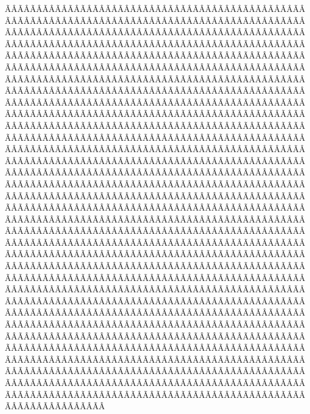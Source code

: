 \begin{sumilla}
\begin{fundamentacion}
ÃÂÃÂÃÂÃÂÃÂÃÂÃÂÃÂÃÂÃÂÃÂÃÂÃÂÃÂÃÂÃÂÃÂÃÂÃÂÃÂÃÂÃÂÃÂÃÂÃÂÃÂÃÂÃÂÃÂÃÂÃÂÃÂÃÂÃÂÃÂÃÂÃÂÃÂÃÂÃÂÃÂÃÂÃÂÃÂÃÂÃÂÃÂÃÂÃÂÃÂÃÂÃÂÃÂÃÂÃÂÃÂÃÂÃÂÃÂÃÂÃÂÃÂÃÂÃÂÃÂÃÂÃÂÃÂÃÂÃÂÃÂÃÂÃÂÃÂÃÂÃÂÃÂÃÂÃÂÃÂÃÂÃÂÃÂÃÂÃÂÃÂÃÂÃÂÃÂÃÂÃÂÃÂÃÂÃÂÃÂÃÂÃÂÃÂÃÂÃÂÃÂÃÂÃÂÃÂÃÂÃÂÃÂÃÂÃÂÃÂÃÂÃÂÃÂÃÂÃÂÃÂÃÂÃÂÃÂÃÂÃÂÃÂÃÂÃÂÃÂÃÂÃÂÃÂÃÂÃÂÃÂÃÂÃÂÃÂÃÂÃÂÃÂÃÂÃÂÃÂÃÂÃÂÃÂÃÂÃÂÃÂÃÂÃÂÃÂÃÂÃÂÃÂÃÂÃÂÃÂÃÂÃÂÃÂÃÂÃÂÃÂÃÂÃÂÃÂÃÂÃÂÃÂÃÂÃÂÃÂÃÂÃÂÃÂÃÂÃÂÃÂÃÂÃÂÃÂÃÂÃÂÃÂÃÂÃÂÃÂÃÂÃÂÃÂÃÂÃÂÃÂÃÂÃÂÃÂÃÂÃÂÃÂÃÂÃÂÃÂÃÂÃÂÃÂÃÂÃÂÃÂÃÂÃÂÃÂÃÂÃÂÃÂÃÂÃÂÃÂÃÂÃÂÃÂÃÂÃÂÃÂÃÂÃÂÃÂÃÂÃÂÃÂÃÂÃÂÃÂÃÂÃÂÃÂÃÂÃÂÃÂÃÂÃÂÃÂÃÂÃÂÃÂÃÂÃÂÃÂÃÂÃÂÃÂÃÂÃÂÃÂÃÂÃÂÃÂÃÂÃÂÃÂÃÂÃÂÃÂÃÂÃÂÃÂÃÂÃÂÃÂÃÂÃÂÃÂÃÂÃÂÃÂÃÂÃÂÃÂÃÂÃÂÃÂÃÂÃÂÃÂÃÂÃÂÃÂÃÂÃÂÃÂÃÂÃÂÃÂÃÂÃÂÃÂÃÂÃÂÃÂÃÂÃÂÃÂÃÂÃÂÃÂÃÂÃÂÃÂÃÂÃÂÃÂÃÂÃÂÃÂÃÂÃÂÃÂÃÂÃÂÃÂÃÂÃÂÃÂÃÂÃÂÃÂÃÂÃÂÃÂÃÂÃÂÃÂÃÂÃÂÃÂÃÂÃÂÃÂÃÂÃÂÃÂÃÂÃÂÃÂÃÂÃÂÃÂÃÂÃÂÃÂÃÂÃÂÃÂÃÂÃÂÃÂÃÂÃÂÃÂÃÂÃÂÃÂÃÂÃÂÃÂÃÂÃÂÃÂÃÂÃÂÃÂÃÂÃÂÃÂÃÂÃÂÃÂÃÂÃÂÃÂÃÂÃÂÃÂÃÂÃÂÃÂÃÂÃÂÃÂÃÂÃÂÃÂÃÂÃÂÃÂÃÂÃÂÃÂÃÂÃÂÃÂÃÂÃÂÃÂÃÂÃÂÃÂÃÂÃÂÃÂÃÂÃÂÃÂÃÂÃÂÃÂÃÂÃÂÃÂÃÂÃÂÃÂÃÂÃÂÃÂÃÂÃÂÃÂÃÂÃÂÃÂÃÂÃÂÃÂÃÂÃÂÃÂÃÂÃÂÃÂÃÂÃÂÃÂÃÂÃÂÃÂÃÂÃÂÃÂÃÂÃÂÃÂÃÂÃÂÃÂÃÂÃÂÃÂÃÂÃÂÃÂÃÂÃÂÃÂÃÂÃÂÃÂÃÂÃÂÃÂÃÂÃÂÃÂÃÂÃÂÃÂÃÂÃÂÃÂÃÂÃÂÃÂÃÂÃÂÃÂÃÂÃÂÃÂÃÂÃÂÃÂÃÂÃÂÃÂÃÂÃÂÃÂÃÂÃÂÃÂÃÂÃÂÃÂÃÂÃÂÃÂÃÂÃÂÃÂÃÂÃÂÃÂÃÂÃÂÃÂÃÂÃÂÃÂÃÂÃÂÃÂÃÂÃÂÃÂÃÂÃÂÃÂÃÂÃÂÃÂÃÂÃÂÃÂÃÂÃÂÃÂÃÂÃÂÃÂÃÂÃÂÃÂÃÂÃÂÃÂÃÂÃÂÃÂÃÂÃÂÃÂÃÂÃÂÃÂÃÂÃÂÃÂÃÂÃÂÃÂÃÂÃÂÃÂÃÂÃÂÃÂÃÂÃÂÃÂÃÂÃÂÃÂÃÂÃÂÃÂÃÂÃÂÃÂÃÂÃÂÃÂÃÂÃÂÃÂÃÂÃÂÃÂÃÂÃÂÃÂÃÂÃÂÃÂÃÂÃÂÃÂÃÂÃÂÃÂÃÂÃÂÃÂÃÂÃÂÃÂÃÂÃÂÃÂÃÂÃÂÃÂÃÂÃÂÃÂÃÂÃÂÃÂÃÂÃÂÃÂÃÂÃÂÃÂÃÂÃÂÃÂÃÂÃÂÃÂÃÂÃÂÃÂÃÂÃÂÃÂÃÂÃÂÃÂÃÂÃÂÃÂÃÂÃÂÃÂÃÂÃÂÃÂÃÂÃÂÃÂÃÂÃÂÃÂÃÂÃÂÃÂÃÂÃÂÃÂÃÂÃÂÃÂÃÂÃÂÃÂÃÂÃÂÃÂÃÂÃÂÃÂÃÂÃÂÃÂÃÂÃÂÃÂÃÂÃÂÃÂÃÂÃÂÃÂÃÂÃÂÃÂÃÂÃÂÃÂÃÂÃÂÃÂÃÂÃÂÃÂÃÂÃÂÃÂÃÂÃÂÃÂÃÂÃÂÃÂÃÂÃÂÃÂÃÂÃÂÃÂÃÂÃÂÃÂÃÂÃÂÃÂÃÂÃÂÃÂÃÂÃÂÃÂÃÂÃÂÃÂÃÂÃÂÃÂÃÂÃÂÃÂÃÂÃÂÃÂÃÂÃÂÃÂÃÂÃÂÃÂÃÂÃÂÃÂÃÂÃÂÃÂÃÂÃÂÃÂÃÂÃÂÃÂÃÂÃÂÃÂÃÂÃÂÃÂÃÂÃÂÃÂÃÂÃÂÃÂÃÂÃÂÃÂÃÂÃÂÃÂÃÂÃÂÃÂÃÂÃÂÃÂÃÂÃÂÃÂÃÂÃÂÃÂÃÂÃÂÃÂÃÂÃÂÃÂÃÂÃÂÃÂÃÂÃÂÃÂÃÂÃÂÃÂÃÂÃÂÃÂÃÂÃÂÃÂÃÂÃÂÃÂÃÂÃÂÃÂÃÂÃÂÃÂÃÂÃÂÃÂÃÂÃÂÃÂÃÂÃÂÃÂÃÂÃÂÃÂÃÂÃÂÃÂ
\end{fundamentacion}
\end{sumilla}
